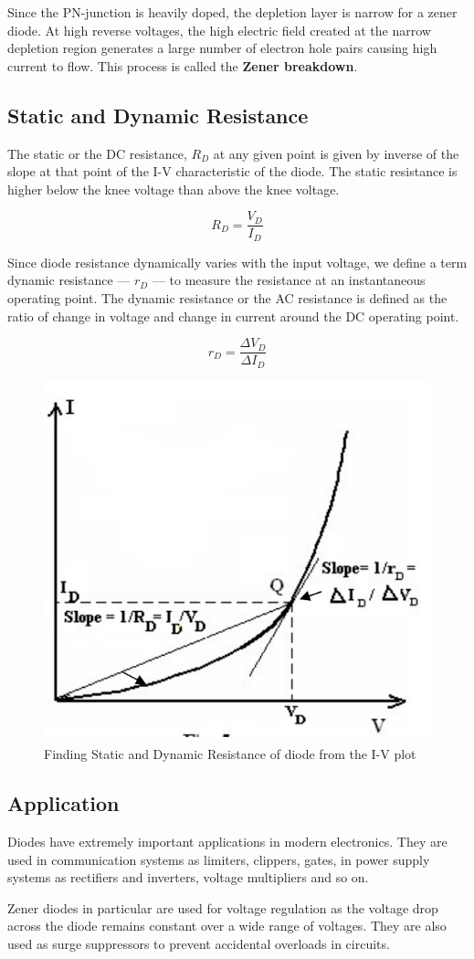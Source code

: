 Since the PN-junction is heavily doped, the depletion layer is narrow for a zener diode. At high reverse voltages, the high electric field created at the narrow depletion region generates a large number of electron hole pairs causing high current to flow. This process is called the \textbf{Zener breakdown}.


\subsection{Static and Dynamic Resistance}
The static or the DC resistance, $R_D$ at any given point is given by inverse of the slope at that point of the I-V characteristic of the diode. The static resistance is higher below the knee voltage
than above the knee voltage.

\begin{equation}
    R_D = \frac{V_D}{I_D}
\end{equation}

Since diode resistance dynamically varies with the input voltage, we define a term dynamic resistance --- $r_D$ --- to measure the resistance at an instantaneous operating point. The dynamic resistance or the AC resistance is defined as the ratio of change in voltage and change in current around the DC operating point.

\begin{equation}
    r_D = \frac{\Delta V_D}{\Delta I_D}
\end{equation}

\begin{figure}[H]
    \centering
    \includegraphics[width=0.6\columnwidth]{images/d5.png}
    \caption{Finding Static and Dynamic Resistance of diode from the I-V plot}
\end{figure}

\subsection{Application}
Diodes have extremely important applications in modern electronics. They are used in communication systems as limiters, clippers, gates, in power supply systems as rectifiers and inverters, voltage multipliers and so on.

Zener diodes in particular are used for voltage regulation as the voltage drop across the diode remains constant over a wide range of voltages. They are also used as surge suppressors to prevent  accidental overloads in circuits.